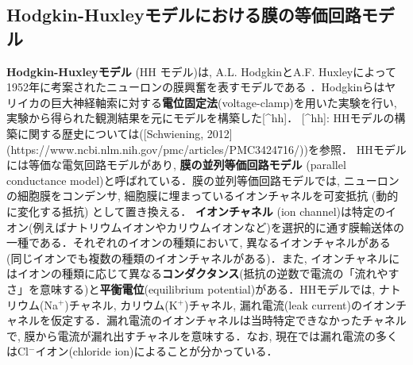 \subsection{Hodgkin-Huxleyモデルにおける膜の等価回路モデル}\textbf{Hodgkin-Huxleyモデル} (HH モデル)は, A.L. HodgkinとA.F. Huxleyによって1952年に考案されたニューロンの膜興奮を表すモデルである \cite{Hodgkin1952-gy}．Hodgkinらはヤリイカの巨大神経軸索に対する\textbf{電位固定法}(voltage-clamp)を用いた実験を行い, 実験から得られた観測結果を元にモデルを構築した[^hh]．
[^hh]: HHモデルの構築に関する歴史については([Schwiening, 2012](https://www.ncbi.nlm.nih.gov/pmc/articles/PMC3424716/))を参照．
HHモデルには等価な電気回路モデルがあり, \textbf{膜の並列等価回路モデル} (parallel conductance model)と呼ばれている．膜の並列等価回路モデルでは, ニューロンの細胞膜をコンデンサ, 細胞膜に埋まっているイオンチャネルを可変抵抗 (動的に変化する抵抗) として置き換える．
\textbf{イオンチャネル} (ion channel)は特定のイオン(例えばナトリウムイオンやカリウムイオンなど)を選択的に通す膜輸送体の一種である．それぞれのイオンの種類において, 異なるイオンチャネルがある (同じイオンでも複数の種類のイオンチャネルがある)．また, イオンチャネルにはイオンの種類に応じて異なる\textbf{コンダクタンス}(抵抗の逆数で電流の「流れやすさ」を意味する)と\textbf{平衡電位}(equilibrium potential)がある．HHモデルでは, ナトリウム(Na$^{+}$)チャネル, カリウム(K$^{+}$)チャネル, 漏れ電流(leak current)のイオンチャネルを仮定する．漏れ電流のイオンチャネルは当時特定できなかったチャネルで, 膜から電流が漏れ出すチャネルを意味する．なお, 現在では漏れ電流の多くはCl$^{-}$イオン(chloride ion)によることが分かっている．